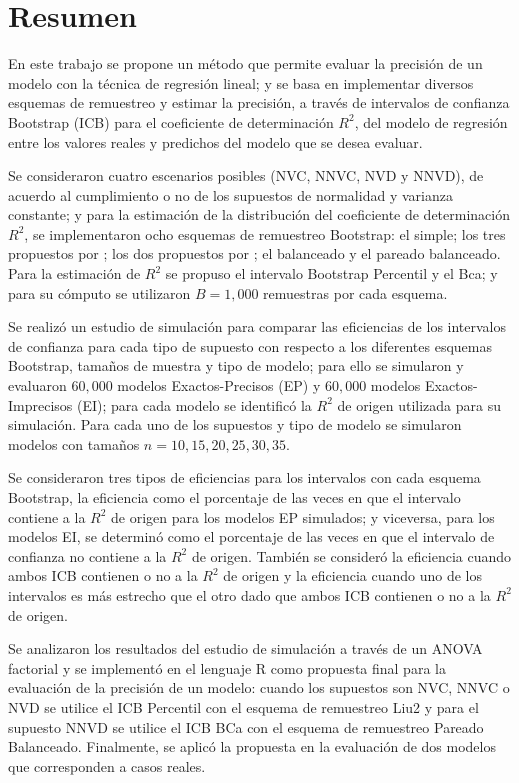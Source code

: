 \section*{Resumen}
En este trabajo se propone un método que permite evaluar la precisión de un modelo con la técnica de regresión lineal; y se basa en implementar diversos esquemas de remuestreo y estimar la precisión, a través de intervalos de confianza Bootstrap (ICB) para el coeficiente de determinación $R^2$, del modelo de regresión entre los valores reales y predichos del modelo que se desea evaluar.\

Se consideraron cuatro escenarios posibles (NVC, NNVC, NVD y NNVD), de acuerdo al cumplimiento o no de los supuestos de normalidad y varianza constante; y para la estimación de la distribución del coeficiente de determinación $R^2$, se implementaron ocho esquemas de remuestreo Bootstrap: el simple; los tres propuestos por \textcite{wu-1986}; los dos propuestos por \textcite{liu-1988}; el balanceado y el pareado balanceado. Para la estimación de $R^2$ se propuso el intervalo Bootstrap Percentil y el Bca; y para su cómputo se utilizaron $B=1,000$ remuestras por cada esquema.\

Se realizó un estudio de simulación para comparar las eficiencias de los intervalos de confianza para cada tipo de supuesto con respecto a los diferentes esquemas Bootstrap, tamaños de muestra y tipo de modelo; para ello se simularon y evaluaron $60,000$ modelos Exactos-Precisos (EP) y $60,000$ modelos Exactos-Imprecisos (EI); para cada modelo se identificó la $R^2$ de origen utilizada para su simulación. Para cada uno de los supuestos y tipo de modelo se simularon modelos con tamaños $n=10, 15, 20, 25, 30, 35$.\

Se consideraron tres tipos de eficiencias para los intervalos con cada esquema Bootstrap, la eficiencia como el porcentaje de las veces en que el intervalo contiene a la $R^2$ de origen para los modelos EP simulados; y viceversa, para los modelos EI, se determinó como el porcentaje de las veces en que el intervalo de confianza no contiene a la $R^2$ de origen. También se consideró la eficiencia cuando ambos ICB contienen o no a la $R^2$ de origen y la eficiencia  cuando uno de los intervalos es más estrecho que el otro dado que ambos ICB contienen o no a la $R^2$ de origen.\

Se analizaron los resultados del estudio de simulación a través de un ANOVA factorial y se implementó en el lenguaje R como propuesta final para la evaluación de la precisión de un modelo: cuando los supuestos son NVC, NNVC o NVD se utilice el ICB Percentil con el esquema de remuestreo Liu2 y para el supuesto NNVD se utilice el ICB BCa con el esquema de remuestreo Pareado Balanceado. Finalmente, se aplicó la propuesta en la evaluación de dos modelos que corresponden a casos reales.
